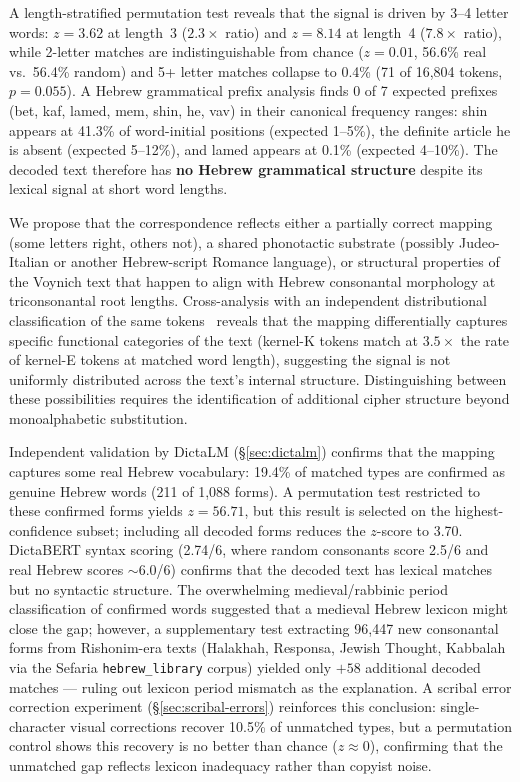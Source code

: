 \documentclass[11pt,a4paper]{article}
\begin{document}
A length-stratified permutation test reveals that the signal is driven
by 3--4 letter words: $z=3.62$ at length~3 ($2.3\times$ ratio) and
$z=8.14$ at length~4 ($7.8\times$ ratio), while 2-letter matches are
indistinguishable from chance ($z=0.01$, 56.6\% real vs.\ 56.4\%
random) and 5+ letter matches collapse to 0.4\% (71 of 16{,}804
tokens, $p=0.055$). A Hebrew grammatical prefix analysis finds 0 of 7
expected prefixes (bet, kaf, lamed, mem, shin, he, vav) in their
canonical frequency ranges: shin appears at 41.3\% of word-initial
positions (expected 1--5\%), the definite article he is absent
(expected 5--12\%), and lamed appears at 0.1\% (expected 4--10\%).
The decoded text therefore has \textbf{no Hebrew grammatical structure}
despite its lexical signal at short word lengths.

We propose that the correspondence reflects either a partially correct
mapping (some letters right, others not), a shared phonotactic substrate
(possibly Judeo-Italian or another Hebrew-script Romance language), or
structural properties of the Voynich text that happen to align with Hebrew
consonantal morphology at triconsonantal root lengths. Cross-analysis with an independent distributional
classification of the same tokens~\citep{DiPrima2026} reveals that the
mapping differentially captures specific functional categories of the text
(kernel-K tokens match at $3.5\times$ the rate of kernel-E tokens at
matched word length), suggesting the signal is not uniformly distributed
across the text's internal structure. Distinguishing between these possibilities requires the
identification of additional cipher structure beyond monoalphabetic
substitution.

Independent validation by DictaLM (\S\ref{sec:dictalm}) confirms that the
mapping captures some real Hebrew vocabulary: 19.4\% of matched types are
confirmed as genuine Hebrew words (211 of 1{,}088 forms). A permutation
test restricted to these confirmed forms yields $z=56.71$, but this
result is selected on the highest-confidence subset; including all
decoded forms reduces the $z$-score to 3.70. DictaBERT syntax scoring
(2.74/6, where random consonants score 2.5/6 and real Hebrew scores
$\sim$6.0/6) confirms that the decoded text has lexical matches but
no syntactic structure.
The overwhelming medieval/rabbinic period classification of confirmed words
suggested that a medieval Hebrew lexicon might close the gap; however,
a supplementary test extracting 96{,}447 new consonantal forms from
Rishonim-era texts (Halakhah, Responsa, Jewish Thought, Kabbalah via the
Sefaria \texttt{hebrew\_library} corpus) yielded only $+58$ additional
decoded matches --- ruling out lexicon period mismatch as the explanation.
A scribal error correction experiment
(\S\ref{sec:scribal-errors}) reinforces this conclusion: single-character
visual corrections recover 10.5\% of unmatched types, but a permutation
control shows this recovery is no better than chance ($z\approx 0$),
confirming that the unmatched gap reflects lexicon inadequacy rather than
copyist noise.
\end{document}
